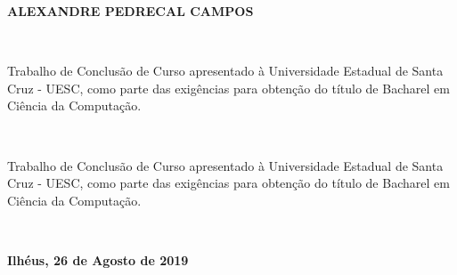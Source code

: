 
%
% 
%
\begin{folhadeaprovacao}


\begin{center}

    {\large \begin{large} \bfseries ALEXANDRE PEDRECAL CAMPOS \end{large}\\}
    \vspace{4cm}
    {\large\bfseries{\begin{large} Trabalho de Conclusão de Curso apresentado à Universidade Estadual de Santa Cruz - UESC, como parte das exigências para obtenção do título de Bacharel em Ciência da Computação. \end{large}}\\}
    \vspace{1cm}
    \hspace{.45\linewidth}
    \begin{minipage}{.50\linewidth}

            Trabalho de Conclusão de Curso apresentado à Universidade Estadual de Santa Cruz - UESC, como parte das exigências para obtenção do título de Bacharel em Ciência da Computação.
    \end{minipage}
    \\
\end{center}
    \textbf{Ilhéus, 26 de Agosto de 2019}
\begin{center}


    \bfseries{}
\end{center}

    \vspace{2.5cm}
    \vspace{3 cm}%


\end{folhadeaprovacao}
